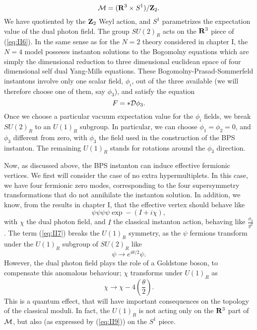 \begin{equation}
{\cal M} = ({\bf R}^3 \times S^1)/{\bf Z}_2.
\label{eq:II6}
\end{equation}
We have quotiented by the ${\bf Z}_2$ Weyl action, and
$S^1$ parametrizes the expectation value of the dual photon field.
The group $SU(2)_R$ acts on the ${\bf R}^3$ piece of
(\ref{eq:II6}). In the same sense as for the $N\!=\!2$ theory
considered in chapter I, the $N\!=\!4$ model posseses instanton
solutions to the Bogomolny equations which are simply the
dimensional reduction to three dimensional euclidean space of
four dimensional self dual Yang-Mills equations. These
Bogomolny-Prasad-Sommerfeld instantons involve only one scalar
field, $\phi_i$, out of the three available (we will therefore 
choose one of them, say $\phi_3$), and satisfy the
equation 
\begin{equation}
F = * {\cal D} \phi_3.
\label{eq:II7}
\end{equation}
Once we choose a particular vacuum expectation value for the
$\phi_i$ fields, we break $SU(2)_R$ to an $U(1)_R$ subgroup. In
particular, we can choose $\phi_1=\phi_2=0$, and $\phi_3$
different from zero, with $\phi_3$ the field used in the
construction of the BPS instanton. The remaining $U(1)_R$ stands
for rotations around the $\phi_3$ direction. 
   
Now, as discussed above, the BPS instanton can induce effective
fermionic vertices. We first will consider the case of no extra
hypermultiplets. In this case, we have four fermionic zero modes,
corresponding to the four supersymmetry transformations that do
not annihilate the instanton solution. In addition, we know, from the results in chapter I, 
that the effective vertex should behave like
\begin{equation}
\psi \psi \psi \psi \exp - (I+i\chi),
\label{eq:II7b}
\end{equation}
with $\chi$ the dual photon field, and $I$ the classical instanton action, behaving 
like $\frac {\phi_3}{g^2}$. The term (\ref{eq:II7}) breaks the $U(1)_R$ 
symmetry, as the $\psi$ fermions transform under the $U(1)_R$ subgroup of 
$SU(2)_R$ like
\begin{equation}
\psi \rightarrow e^{i \theta/2} \psi.
\label{eq:II8}
\end{equation}
However, the dual photon field plays the role of a Goldstone
boson, to compensate this anomalous behaviour; $\chi$
transforms under $U(1)_R$ as
\begin{equation}
\chi \rightarrow \chi - 4 \left( \frac {\theta}{2} \right).
\label{eq:II9}
\end{equation}
This is a quantum effect, that will have important consequences
on the topology of the classical moduli. In fact, the $U(1)_R$ is
not acting only on the ${\bf R}^3$ part of ${\cal M}$, but also
(as expressed by (\ref{eq:II9})) on the $S^1$ piece.
  
